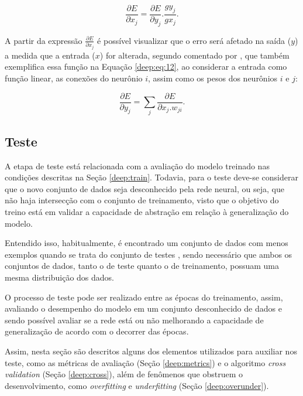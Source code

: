 \begin{equation}
    \label{deep:eq:11}
    \frac{\partial E}{\partial x_j} = \frac{\partial E}{\partial y_j} . \frac{g y_j}{g x_j}.
\end{equation}

A partir da expressão $\frac{\partial E}{\partial x_j}$ é possível visualizar que o erro será afetado na saída ($y$) a medida que a entrada ($x$) for alterada, segundo comentado por \cite{rumelhart1986learning}, que também exemplifica essa função na Equação \ref{deep:eq:12}, ao considerar a entrada como função linear, as conexões do neurônio $i$, assim como os pesos dos neurônios $i$ e $j$:

\begin{equation}
    \label{deep:eq:12}
    \frac{\partial E}{\partial y_j} = \sum_j \frac{\partial E}{\partial x_j . w_{ji}}.
\end{equation}


\subsection{Teste}
\label{deep:test}

A etapa de teste está relacionada com a avaliação do modelo treinado nas condições descritas na Seção \ref{deep:train}. Todavia, para o teste deve-se considerar que o novo conjunto de dados seja desconhecido pela rede neural, ou seja, que não haja intersecção com o conjunto de treinamento, visto que o objetivo do treino está em validar a capacidade de abstração em relação à generalização do modelo.

Entendido isso, habitualmente, é encontrado um conjunto de dados com menos exemplos quando se trata do conjunto de testes \citep{Goodfellow2016}, sendo necessário que ambos os conjuntos de dados, tanto o de teste quanto o de treinamento, possuam uma mesma distribuição dos dados.

O processo de teste pode ser realizado entre as épocas do treinamento, assim, avaliando o desempenho do modelo em um conjunto desconhecido de dados e sendo possível avaliar se a rede está ou não melhorando a capacidade de generalização de acordo com o decorrer das épocas.

Assim, nesta seção são descritos alguns dos elementos utilizados para auxiliar nos teste, como as métricas de avaliação (Seção \ref{deep:metrics}) e o algoritmo \textit{cross validation} (Seção \ref{deep:cross}), além de fenômenos que obstruem o desenvolvimento, como \textit{overfitting} e \textit{underfitting} (Seção \ref{deep:overunder}).


